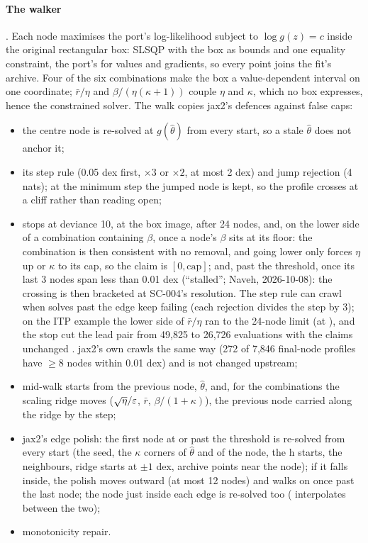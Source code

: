 \paragraph{The walker} . Each node maximises the port's log-likelihood subject to
$\log g(z)=c$ inside the original rectangular box: SLSQP with the box as bounds and one equality constraint, the
port's  for values and gradients, so every point joins the fit's archive. Four of the six
combinations make the box a value-dependent interval on one coordinate; $\bar r/\eta$ and $\beta/(\eta(\kappa+1))$
couple $\eta$ and $\kappa$, which no box expresses, hence the constrained solver. The walk copies jax2's defences
against false caps:
\begin{itemize}[nosep]
  \item the centre node is re-solved at $g(\hat\theta)$ from every start, so a stale $\hat\theta$ does not anchor it;
  \item its step rule (0.05 dex first, $\times3$ or $\times2$, at most 2 dex) and jump rejection (4 nats); at the
    minimum step the jumped node is kept, so the profile crosses at a cliff rather than reading open;
  \item stops at deviance 10, at the box image, after 24 nodes, and, on the lower side of a combination containing
    $\beta$, once a node's $\beta$ sits at its floor: the combination is then consistent with no removal, and going
    lower only forces $\eta$ up or $\kappa$ to its cap, so the claim is $[0,\text{cap}]$; and, past the threshold,
    once its last 3 nodes span less than 0.01 dex (``stalled''; Naveh, 2026-10-08): the crossing is then bracketed
    at SC-004's resolution. The step rule can crawl when solves past the edge keep failing (each rejection divides
    the step by 3); on the ITP example the lower side of $\bar r/\eta$ ran to the 24-node limit (at ),
    and the stop cut the lead pair from 49,825 to 26,726 evaluations with the claims unchanged
    . jax2's own  crawls the
    same way (272 of 7,846 final-node profiles have $\ge8$ nodes within 0.01 dex) and is not changed upstream;
  \item mid-walk starts from the previous node, $\hat\theta$, and, for the combinations the scaling ridge moves
    ($\sqrt\eta/\varepsilon$, $\bar r$, $\beta/(1+\kappa)$), the previous node carried along the ridge by the step;
  \item jax2's edge polish: the first node at or past the threshold is re-solved from every start (the seed, the
    $\kappa$ corners of $\hat\theta$ and of the node, the h starts, the neighbours, ridge starts at $\pm1$ dex, archive
    points near the node); if it falls inside, the polish moves outward (at most 12 nodes) and walks on once past the
    last node; the node just inside each edge is re-solved too ( interpolates between the two);
  \item monotonicity repair.
\end{itemize}
